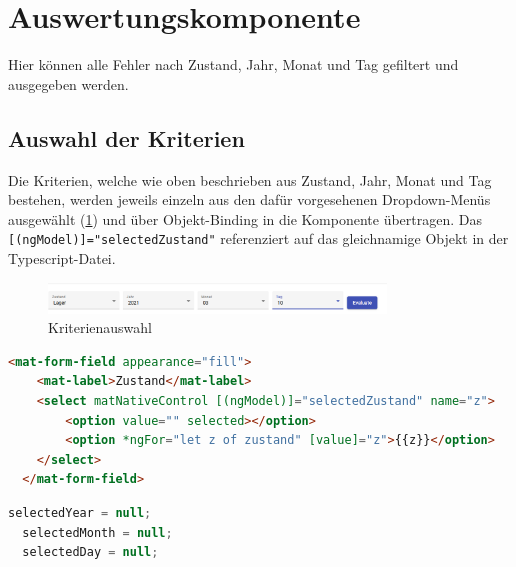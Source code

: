 \section{Auswertungskomponente}
Hier können alle Fehler nach Zustand, Jahr, Monat und Tag gefiltert und ausgegeben werden. 

\subsection{Auswahl der Kriterien}
Die Kriterien, welche wie oben beschrieben aus Zustand, Jahr, Monat und Tag bestehen, werden jeweils einzeln aus den dafür vorgesehenen
Dropdown-Menüs ausgewählt (\ref{fig:auswahl}) und über Objekt-Binding in die Komponente übertragen. Das \lstinline|[(ngModel)]="selectedZustand"|
referenziert auf das gleichnamige Objekt in der Typescript-Datei.
\begin{figure}[H]
    \centering
    \includegraphics[width=0.80\textwidth]{pics/dropdown.PNG}
    \caption{Kriterienauswahl}
    \label{fig:auswahl}
\end{figure}

\begin{lstlisting}[language=HTML, caption={HTML-Code des Dropdown-Menüs des Zustandes}]
  <mat-form-field appearance="fill">
    <mat-label>Zustand</mat-label>
    <select matNativeControl [(ngModel)]="selectedZustand" name="z">
        <option value="" selected></option>
        <option *ngFor="let z of zustand" [value]="z">{{z}}</option>
    </select>
  </mat-form-field>
\end{lstlisting}
\begin{lstlisting}[language=Typescript, caption={Binding-Objekte in der Typescript-Datei}]
  selectedYear = null;
  selectedMonth = null;
  selectedDay = null;
\end{lstlisting}

